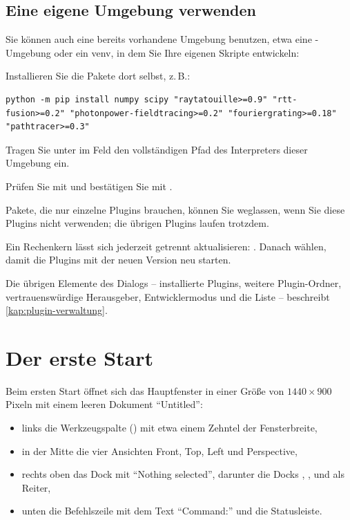 \subsection{Eine eigene Umgebung verwenden}

Sie können auch eine bereits vorhandene Umgebung benutzen, etwa eine -Umgebung
oder ein venv, in dem Sie Ihre eigenen Skripte entwickeln:

\begin{schritte}
  \item Installieren Sie die Pakete dort selbst, z.\,B.:
\begin{lstlisting}
python -m pip install numpy scipy "raytatouille>=0.9" "rtt-fusion>=0.2" "photonpower-fieldtracing>=0.2" "fouriergrating>=0.18" "pathtracer>=0.3"
\end{lstlisting}
  \item Tragen Sie unter  im Feld  den
    vollständigen Pfad des Interpreters dieser Umgebung ein.
  \item Prüfen Sie mit  und bestätigen Sie mit .
\end{schritte}

Pakete, die nur einzelne Plugins brauchen, können Sie weglassen, wenn Sie diese Plugins nicht
verwenden; die übrigen Plugins laufen trotzdem.

\begin{tipp}
Ein Rechenkern lässt sich jederzeit getrennt aktualisieren:
. Danach  wählen, damit die Plugins mit der neuen Version neu starten.
\end{tipp}

Die übrigen Elemente des Dialogs  -- installierte Plugins, weitere
Plugin-Ordner, vertrauenswürdige Herausgeber, Entwicklermodus und die Liste
 -- beschreibt \autoref{kap:plugin-verwaltung}.

\section{Der erste Start}\label{sec:erster-start}

Beim ersten Start öffnet sich das Hauptfenster in einer Größe von $1440 \times 900$ Pixeln
mit einem leeren Dokument \enquote{Untitled}:

\begin{itemize}
  \item links die Werkzeugspalte () mit etwa einem Zehntel der Fensterbreite,
  \item in der Mitte die vier Ansichten Front, Top, Left und Perspective,
  \item rechts oben das Dock  mit \enquote{Nothing selected}, darunter
    die Docks , ,  und  als Reiter,
  \item unten die Befehlszeile mit dem Text \enquote{Command:} und die Statusleiste.
\end{itemize}

